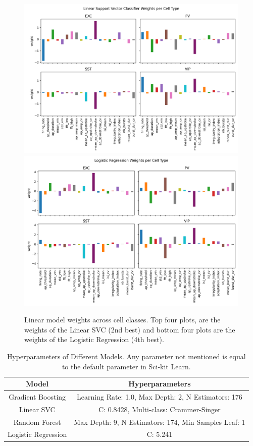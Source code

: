 \documentclass{IEEEtran}
\begin{document}
\begin{figure}[h!]%
  \centering
  \includegraphics[width=0.9\columnwidth]{figures/weights_linearsvc.png}
  \includegraphics[width=0.9\columnwidth]{figures/weights_logistic_regression.png}
  \caption{Linear model weights across cell classes. Top four plots, are the weights of the Linear SVC (2nd best) and bottom four plots are the weights of the Logistic Regression (4th best).}%
  \label{fig:weights}
\end{figure}


\begin{table}[h!]
  \centering
  \begin{tabular}{|c|c|}
      \hline
      \textbf{Model} & \textbf{Hyperparameters} \\
      \hline
      Gradient Boosting & Learning Rate: 1.0, Max Depth: 2, N Estimators: 176 \\
      \hline
      Linear SVC & C: 0.8428, Multi-class: Crammer-Singer \\
      \hline
      Random Forest & Max Depth: 9, N Estimators: 174, Min Samples Leaf: 1 \\
      \hline
      Logistic Regression & C: 5.241 \\
      \hline
  \end{tabular}
  \caption{Hyperparameters of Different Models. Any parameter not mentioned is equal to the default parameter in Sci-kit Learn.}
  \label{tab:hyperparameters}
\end{table}
\end{document}
